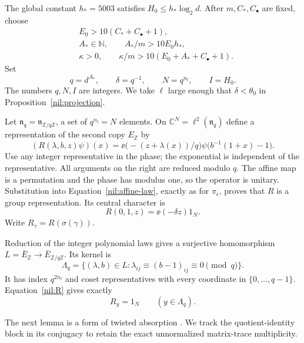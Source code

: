 The global constant \(h_*=5003\) satisfies \(H_0\le h_*\log_2d\).
After \(m,C_*,C_\bullet\) are fixed, choose
\begin{equation}\label{nil:parameter-order}
 \begin{split}
 &E_0>10(C_*+C_\bullet+1),\\
 &A_*\in\mathbb N,\qquad A_*/m>10E_0h_*,\\
 &\kappa>0,\qquad
        \kappa/m>10(E_0+A_*+C_\bullet+1).
 \end{split}
\end{equation}
Set
\begin{equation}\label{nil:q}
 q=d^{A_*},\qquad \delta=q^{-1},\qquad
 N=q^{n_{\mathrm f}},\qquad I=H_0.
\end{equation}
The numbers \(q,N,I\) are integers. We take \(\ell\) large enough
that \(\delta<\theta_0\) in Proposition~\ref{nil:projection}.

Let \(\mathfrak n_q=\mathfrak n_{\mathbb Z/q\mathbb Z}\), a set of
\(q^{n_{\mathrm f}}=N\) elements. On
\(\mathbb C^N=\ell^2(\mathfrak n_q)\) define a representation of
the second copy \(E_{\mathbb Z}\) by
\begin{equation}\label{nil:R}
 (R(\lambda,b,z)\psi)(x)
   =\ee\bigl(-(z+\lambda(x))/q\bigr)
               \psi\bigl(b^{-1}(1+x)-1\bigr).
\end{equation}
Use any integer representative in the phase; the exponential
is independent of the representative. All arguments on the
right are reduced modulo \(q\). The affine map is a permutation
and the phase has modulus one, so the operator is unitary.
Substitution into Equation~\ref{nil:affine-law}, exactly as for
\(\pi_\epsilon\), proves that \(R\) is a group representation.
Its central character is
\[
 R(0,1,z)=\ee(-\delta z)1_N.
\]
Write \(R_\gamma=R(\sigma(\gamma))\).

Reduction of the integer polynomial laws gives a surjective
homomorphism \(L=\bar E_{\mathbb Z}\to\bar E_{\mathbb Z/q\mathbb Z}\).
Its kernel is
\[
 \Lambda_q=\{(\lambda,b)\in L:
       \lambda_{ij}\equiv(b-1)_{ij}\equiv0\pmod q\}.
\]
It has index \(q^{2n_{\mathrm f}}\) and coset representatives
with every coordinate in \(\{0,\ldots,q-1\}\).
Equation~\ref{nil:R} gives exactly
\begin{equation}\label{nil:congruence-R}
 R_y=1_N\qquad(y\in\Lambda_q).
\end{equation}

The next lemma is a form of twisted absorption
\cite[Lemma~2.4]{EchterhoffWilliams2012}. We track the quotient-identity
block in its conjugacy to retain the exact unnormalized matrix-trace
multiplicity.

